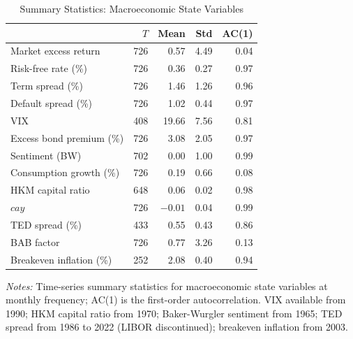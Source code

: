 \begin{table}[H]
\centering
\caption{Summary Statistics: Macroeconomic State Variables}
\label{tab:summary_macro}
\scriptsize\setlength{\tabcolsep}{3pt}\renewcommand{\arraystretch}{0.9}
\begin{tabular}{lrrrr}
\toprule
 & $T$ & Mean & Std & AC(1) \\
\midrule
Market excess return & 726 & 0.57 & 4.49 & 0.04 \\
Risk-free rate (\%) & 726 & 0.36 & 0.27 & 0.97 \\
Term spread (\%) & 726 & 1.46 & 1.26 & 0.96 \\
Default spread (\%) & 726 & 1.02 & 0.44 & 0.97 \\
VIX & 408 & 19.66 & 7.56 & 0.81 \\
Excess bond premium (\%) & 726 & 3.08 & 2.05 & 0.97 \\
Sentiment (BW) & 702 & 0.00 & 1.00 & 0.99 \\
Consumption growth (\%) & 726 & 0.19 & 0.66 & 0.08 \\
HKM capital ratio & 648 & 0.06 & 0.02 & 0.98 \\
$cay$ & 726 & $-0.01$ & 0.04 & 0.99 \\
TED spread (\%) & 433 & 0.55 & 0.43 & 0.86 \\
BAB factor & 726 & 0.77 & 3.26 & 0.13 \\
Breakeven inflation (\%) & 252 & 2.08 & 0.40 & 0.94 \\
\bottomrule
\end{tabular}
\begin{minipage}{\textwidth}
\vspace{2pt}
\scriptsize{}
\textit{Notes:} Time-series summary statistics for macroeconomic state variables at monthly frequency; AC(1) is the first-order autocorrelation. VIX available from 1990; HKM capital ratio from 1970; Baker-Wurgler sentiment from 1965; TED spread from 1986 to 2022 (LIBOR discontinued); breakeven inflation from 2003.
\end{minipage}
\end{table}
